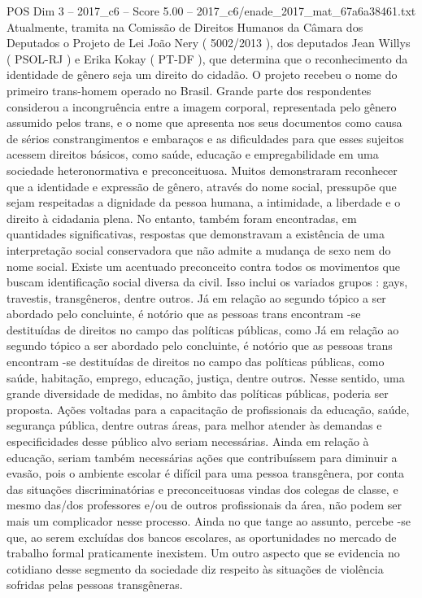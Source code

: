 \begin{textsample}{POS Dim 3 – 2017\_c6 – Score 5.00 – 2017\_c6/enade\_2017\_mat\_67a6a38461.txt}
Atualmente, tramita na Comissão de Direitos Humanos da Câmara dos Deputados o Projeto de Lei João Nery ( 5002/2013 ), dos deputados Jean Willys ( PSOL-RJ ) e Erika Kokay ( PT-DF ), que determina que o reconhecimento da identidade de gênero seja um direito do cidadão.
O projeto recebeu o nome do primeiro trans-homem operado no Brasil.
Grande parte dos respondentes considerou a incongruência entre a imagem corporal, representada pelo gênero assumido pelos trans, e o nome que apresenta nos seus documentos como causa de sérios constrangimentos e embaraços e as dificuldades para que esses sujeitos acessem direitos básicos, como saúde, educação e empregabilidade em uma sociedade heteronormativa e preconceituosa.
Muitos demonstraram reconhecer que a identidade e expressão de gênero, através do nome social, pressupõe que sejam respeitadas a dignidade da pessoa humana, a intimidade, a liberdade e o direito à cidadania plena.
No entanto, também foram encontradas, em quantidades significativas, respostas que demonstravam a existência de uma interpretação social conservadora que não admite a mudança de sexo nem do nome social.
Existe um acentuado preconceito contra todos os movimentos que buscam identificação social diversa da civil.
Isso inclui os variados grupos : gays, travestis, transgêneros, dentre outros.
Já em relação ao segundo tópico a ser abordado pelo concluinte, é notório que as pessoas trans encontram -se destituídas de direitos no campo das políticas públicas, como Já em relação ao segundo tópico a ser abordado pelo concluinte, é notório que as pessoas trans encontram -se destituídas de direitos no campo das políticas públicas, como saúde, habitação, emprego, educação, justiça, dentre outros.
Nesse sentido, uma grande diversidade de medidas, no âmbito das políticas públicas, poderia ser proposta.
Ações voltadas para a capacitação de profissionais da educação, saúde, segurança pública, dentre outras áreas, para melhor atender às demandas e especificidades desse público alvo seriam necessárias.
Ainda em relação à educação, seriam também necessárias ações que contribuíssem para diminuir a evasão, pois o ambiente escolar é difícil para uma pessoa transgênera, por conta das situações discriminatórias e preconceituosas vindas dos colegas de classe, e mesmo das/dos professores e/ou de outros profissionais da área, não podem ser mais um complicador nesse processo.
Ainda no que tange ao assunto, percebe -se que, ao serem excluídas dos bancos escolares, as oportunidades no mercado de trabalho formal praticamente inexistem.
Um outro aspecto que se evidencia no cotidiano desse segmento da sociedade diz respeito às situações de violência sofridas pelas pessoas transgêneras.

\end{textsample}
